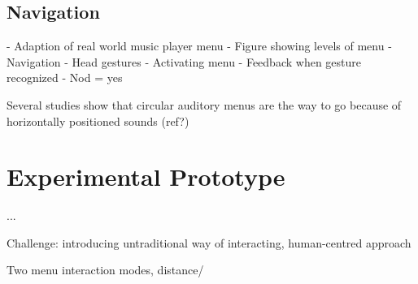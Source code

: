 \subsection{Navigation}
- Adaption of real world music player menu
- Figure showing levels of menu
- Navigation
- Head gestures
- Activating menu
- Feedback when gesture recognized
- Nod = yes

Several studies show that circular auditory menus are the way to go because of horizontally positioned sounds (ref?)


\section{Experimental Prototype}
...

Challenge: introducing untraditional way of interacting, human-centred approach

Two menu interaction modes, distance/


























